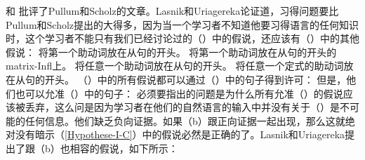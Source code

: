  \citet{LU2002a}和 \citet{LY2002a}批评了Pullum和Scholz的文章。Lasnik和Uriagereka论证道，习得问题要比Pullum和Scholz提出的大得多，因为当一个学习者不知道他要习得语言的任何知识时，这个学习者不能只有我们已经讨论过的（）中的假说，还应该有（）中的其他假说：
\eal
\label{Hilfsverbhypothesen}
\ex 将第一个助动词放在从句的开头。
\ex\label{Hypothese-I-C} 
将第一个助动词放在从句的开头的matrix-Infl上。
\zl
\eal
\ex 将任意一个助动词放在从句的开头。
\ex 将任意一个定式的助动词放在从句的开头。
\zl
（）中的所有假说都可以通过（）中的句子得到许可：
\eal
{}
\zl
但是，他们也可以允准（）中的句子：
\z
必须要指出的问题是为什么所有允准（）的假说应该被丢弃，这么问是因为学习者在他们的自然语言的输入中并没有关于（）是不可能的任何信息。他们缺乏负向证据。如果（b）跟正向证据一起出现，那么这就绝对没有暗示（\ref{Hypothese-I-C}）中的假说必然是正确的了。Lasnik和Uriagereka提出了跟（b）也相容的假说，如下所示：
